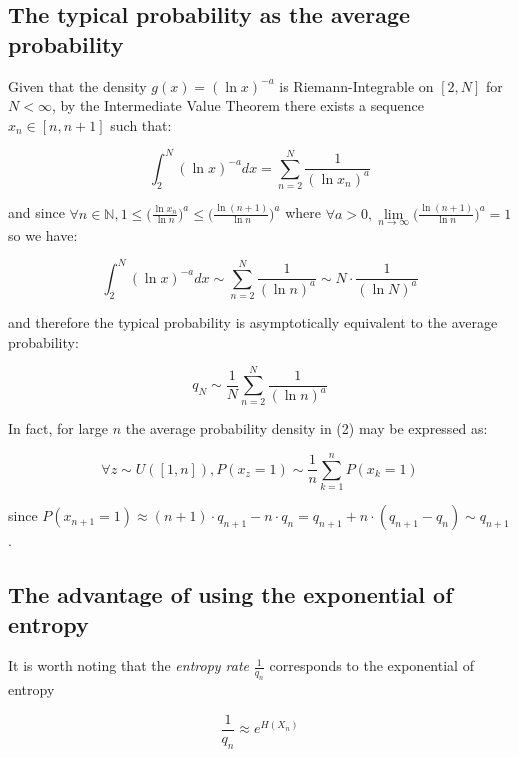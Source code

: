 \documentclass{article}
\begin{document}
\subsection{The typical probability as the average probability}

Given that the density $g(x) = (\ln x)^{-a}$ is Riemann-Integrable on $[2,N]$ for $N < \infty$, by the Intermediate Value Theorem there exists a sequence $x_n \in [n,n+1]$ such that: 

\begin{equation}
\int_{2}^N (\ln x)^{-a} dx = \sum_{n=2}^N \frac{1}{(\ln x_n)^a}
\end{equation}

and since $\forall n \in \mathbb{N}, 1 \leq \big(\frac{\ln x_n}{\ln n}\big)^a \leq \big(\frac{\ln (n+1)}{\ln n}\big)^a$ where $\forall a > 0, \lim\limits_{n \to \infty} \big(\frac{\ln (n+1)}{\ln n}\big)^a = 1$ so we have: 

\begin{equation}
\int_{2}^N (\ln x)^{-a} dx \sim \sum_{n=2}^N \frac{1}{(\ln n)^a} \sim N \cdot \frac{1}{(\ln N)^a}
\end{equation}

and therefore the typical probability is asymptotically equivalent to the 
average probability: 

\begin{equation}
q_N \sim \frac{1}{N} \sum_{n=2}^N \frac{1}{(\ln n)^a} 	
\end{equation}

In fact, for large $n$ the average probability density in (2) may be expressed as: 

\begin{equation}
\forall z \sim U([1,n]), P(x_z = 1) \sim \frac{1}{n} \sum_{k=1}^n P(x_k = 1)	\end{equation}

since $P(x_{n+1}=1) \approx (n+1) \cdot q_{n+1} - n \cdot q_n = q_{n+1} + n \cdot (q_{n+1}-q_n) \sim q_{n+1}$. 

\subsection{The advantage of using the exponential of entropy}

It is worth noting that the \textit{entropy rate} $\frac{1}{q_n}$ corresponds 
to the exponential of entropy

\begin{equation}
\frac{1}{q_n} \approx e^{H(X_n)}	
\end{equation}
\end{document}
